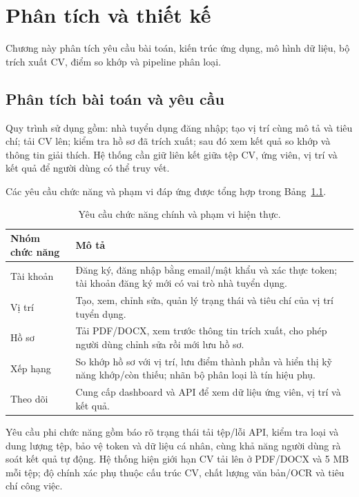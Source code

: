 \chapter{Phân tích và thiết kế}
\label{ch:thietke}

\begin{muctieu}
Chương này phân tích yêu cầu bài toán, kiến trúc ứng dụng, mô hình dữ liệu, bộ trích xuất CV, điểm so khớp và pipeline phân loại.
\end{muctieu}

\section{Phân tích bài toán và yêu cầu}
Quy trình sử dụng gồm: nhà tuyển dụng đăng nhập; tạo vị trí cùng mô tả và tiêu chí; tải CV lên; kiểm tra hồ sơ đã trích xuất; sau đó xem kết quả so khớp và thông tin giải thích. Hệ thống cần giữ liên kết giữa tệp CV, ứng viên, vị trí và kết quả để người dùng có thể truy vết.

Các yêu cầu chức năng và phạm vi đáp ứng được tổng hợp trong Bảng~\ref{tab:yeucau}.
\begin{table}[H]
\centering
\caption{Yêu cầu chức năng chính và phạm vi hiện thực.}
\label{tab:yeucau}
\begin{tabular}{p{}p{}}
\toprule
\textbf{Nhóm chức năng} & \textbf{Mô tả} \\
\midrule
Tài khoản & Đăng ký, đăng nhập bằng email/mật khẩu và xác thực token; tài khoản đăng ký mới có vai trò nhà tuyển dụng. \\
Vị trí & Tạo, xem, chỉnh sửa, quản lý trạng thái và tiêu chí của vị trí tuyển dụng. \\
Hồ sơ & Tải PDF/DOCX, xem trước thông tin trích xuất, cho phép người dùng chỉnh sửa rồi mới lưu hồ sơ. \\
Xếp hạng & So khớp hồ sơ với vị trí, lưu điểm thành phần và hiển thị kỹ năng khớp/còn thiếu; nhãn bộ phân loại là tín hiệu phụ. \\
Theo dõi & Cung cấp dashboard và API để xem dữ liệu ứng viên, vị trí và kết quả. \\
\bottomrule
\end{tabular}
\end{table}

Yêu cầu phi chức năng gồm báo rõ trạng thái tải tệp/lỗi API, kiểm tra loại và dung lượng tệp, bảo vệ token và dữ liệu cá nhân, cùng khả năng người dùng rà soát kết quả tự động. Hệ thống hiện giới hạn CV tải lên ở PDF/DOCX và 5 MB mỗi tệp; độ chính xác phụ thuộc cấu trúc CV, chất lượng văn bản/OCR và tiêu chí công việc.

